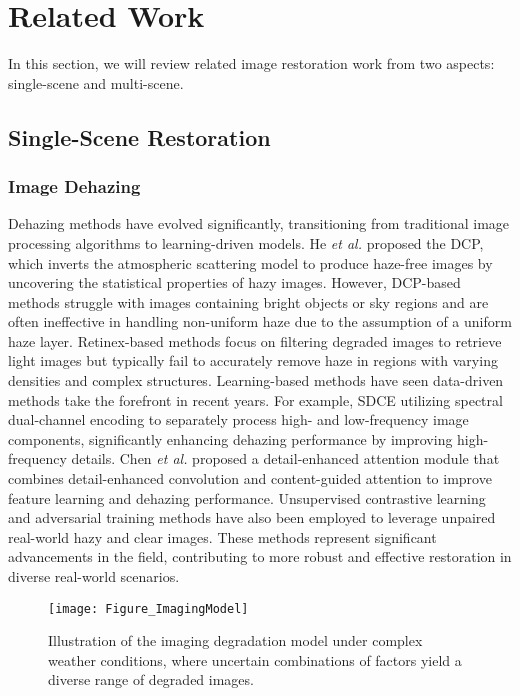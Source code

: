 \section{Related Work}
\label{sec:relatedwork}
%
    In this section, we will review related image restoration work from two aspects: single-scene and multi-scene.
%

\subsection{Single-Scene Restoration}
%
\subsubsection{Image Dehazing}
%
    Dehazing methods have evolved significantly, transitioning from traditional image processing algorithms to learning-driven models. He \textit{et al.} \citep{he2010single} proposed the DCP, which inverts the atmospheric scattering model to produce haze-free images by uncovering the statistical properties of hazy images. However, DCP-based methods \citep{fattal2014dehazing,liu2022rank} struggle with images containing bright objects or sky regions and are often ineffective in handling non-uniform haze due to the assumption of a uniform haze layer. Retinex-based methods \citep{fu2014retinex,kandhway2023adaptive} focus on filtering degraded images to retrieve light images but typically fail to accurately remove haze in regions with varying densities and complex structures. Learning-based methods \citep{zhu2023spectral,chen2024dea} have seen data-driven methods take the forefront in recent years. For example, SDCE \citep{zhu2023spectral} utilizing spectral dual-channel encoding to separately process high- and low-frequency image components, significantly enhancing dehazing performance by improving high-frequency details. Chen \textit{et al.} \citep{chen2024dea} proposed a detail-enhanced attention module that combines detail-enhanced convolution and content-guided attention to improve feature learning and dehazing performance. Unsupervised contrastive learning and adversarial training methods \citep{liu2024dfp} have also been employed to leverage unpaired real-world hazy and clear images. These methods represent significant advancements in the field, contributing to more robust and effective restoration in diverse real-world scenarios.
%
    \begin{figure}[t]
        \centering
        \setlength{\abovecaptionskip}{0.cm}
        \texttt{[image: Figure\_ImagingModel]}
        \caption{Illustration of the imaging degradation model under complex weather conditions, where uncertain combinations of factors yield a diverse range of degraded images.}
        \label{Figure_ImagingModel}
    \end{figure}
